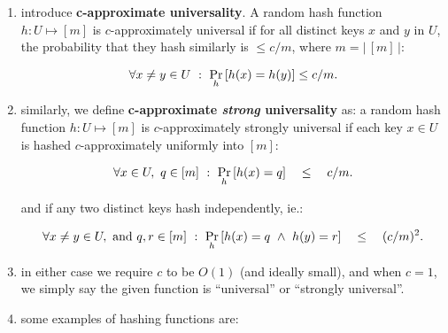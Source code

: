 \begin{enumerate}
  \item introduce \textbf{c-approximate universality}. A random hash function $h
    : U \mapsto [m]$ is $c$-approximately universal if for all distinct keys $x$
    and $y$ in $U$, the probability that they hash similarly is $\leq c/m$,
    where $m = |\,[m]\,|$:
    \begin{textred}
      \begin{align}
        \forall x \neq y \in U\ :\ \underset{h}{\text{Pr}}\left[h(x) = h(y)\right] \leq c/m.
      \end{align}
    \end{textred}

  \item similarly, we define \textbf{c-approximate \emph{strong} universality}
    as: a random hash function $h : U \mapsto [m]$ is $c$-approximately strongly
    universal if each key $x \in U$ is hashed $c$-approximately uniformly into
    $[m]$:
    \begin{textred}
      \begin{align}
        \forall x \in U,\ q \in [m]\ :\ \underset{h}{\text{Pr}}\left[h(x) = q\right]\quad \leq\quad c/m.
      \end{align}
    \end{textred}

    and if any two distinct keys hash independently, ie.:

    \begin{textred}
      \begin{align}
        \forall x \neq y \in U,\text{ and } q, r \in [m]\ :\ \underset{h}{\text{Pr}}\left[h(x) = q\
        \land\ h(y) = r\right] \quad\leq\quad (c/m)^2.
      \end{align}
    \end{textred}

  \item in either case we require $c$ to be $O(1)$ (and ideally small), and
    when $c = 1$, we simply say the given function is ``universal'' or
    ``strongly universal''.

  \item some examples of hashing functions are: 

    \begin{enumerate}

\end{enumerate}
\end{enumerate}
